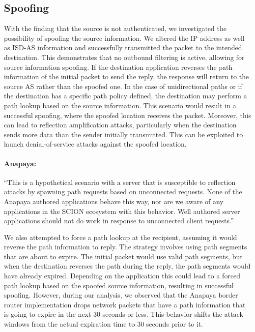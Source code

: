 \subsection{Spoofing}
\label{sec:spoofing}
With the finding that the source is not authenticated, we investigated the possibility of spoofing the source information.
We altered the IP address as well as ISD-AS information and successfully transmitted the packet to the intended destination.
This demonstrates that no outbound filtering is active, allowing for source information spoofing.
If the destination application reverses the path information of the initial packet to send the reply, the response will return to the source AS rather than the spoofed one.
In the case of unidirectional paths or if the destination has a specific path policy defined, the destination may perform a path lookup based on the source information.
This scenario would result in a successful spoofing, where the spoofed location receives the packet.
Moreover, this can lead to reflection amplification attacks, particularly when the destination sends more data than the sender initially transmitted.
This can be exploited to launch denial-of-service attacks against the spoofed location.
\newpage
\begin{boxH}
\paragraph{Anapaya:}
``This is a hypothetical scenario with a server that is susceptible to reflection attacks by spawning path requests based on unconnected requests. None of the Anapaya authored applications behave this way, nor are we aware of any applications in the SCION ecosystem with this behavior. Well authored server applications should not do work in response to unconnected client requests.''
\end{boxH}

We also attempted to force a path lookup at the recipient, assuming it would reverse the path information to reply.
The strategy involves using path segments that are about to expire.
The initial packet would use valid path segments, but when the destination reverses the path during the reply, the path segments would have already expired.
Depending on the application this could lead to a forced path lookup based on the spoofed source information, resulting in successful spoofing.
However, during our analysis, we observed that the Anapaya border router implementation drops network packets that have a path information that is going to expire in the next 30 seconds or less.
This behavior shifts the attack windows from the actual expiration time to 30 seconds prior to it.


